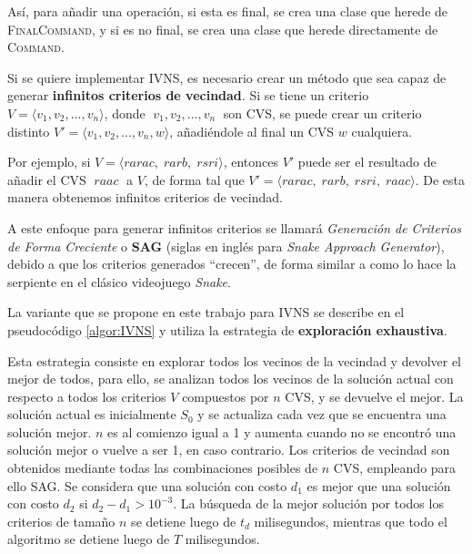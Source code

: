 \documentclass[a4paper,10pt,twocolumn]{article}
\begin{document}
	Así, para añadir una operación, si esta es final, se crea una clase que herede de 
	\textsc{FinalCommand}, y si es no final, se crea una clase que herede directamente
	de \textsc{Command}.

	Si se quiere implementar IVNS, es necesario crear un método que sea capaz de generar 
	\textbf{infinitos criterios de vecindad}. Si se tiene un criterio 
	$V = \langle v_1, v_2, ..., v_n \rangle$, donde $\; v_1, v_2, ..., v_n \;$ son CVS,
	se puede crear un criterio distinto $V' = \langle v_1, v_2, ..., v_n, w \rangle$, 
	añadiéndole al final un CVS $w$ cualquiera. 
	
	Por ejemplo, si	$V = \langle rarac,\; rarb, \; rsri \rangle $, entonces $V'$ puede ser el 
	resultado de añadir el CVS $\;raac\;$ a $V$, de forma tal que 
	$V'= \langle rarac,\; rarb,\; rsri,\; raac \rangle$. De esta manera obtenemos infinitos 
	criterios de vecindad.
	
	A este enfoque para generar infinitos criterios se llamará 
	\textit{Generación de Criterios de Forma Creciente} o \textbf{SAG} (siglas en inglés para 
	\textit{Snake Approach Generator}), debido a que los criterios generados
	``crecen'', de forma similar a como lo hace la serpiente en el clásico videojuego 
	\textit{Snake}.

	La variante que se propone en este trabajo para IVNS se describe en el pseudocódigo 
	\ref{algor:IVNS} y utiliza la estrategia de \textbf{exploración exhaustiva}.

	Esta estrategia consiste en explorar todos los vecinos de la vecindad y devolver el 
	mejor de todos, para ello, se analizan todos los vecinos de la solución actual con
	respecto a todos los criterios $V$ compuestos por $n$ CVS, y se devuelve el mejor. La solución actual es inicialmente $S_0$ y se actualiza cada vez que se encuentra una soluci\'on mejor. $n$ es al comienzo igual a 1 y aumenta cuando no se encontr\'o una solución mejor o vuelve a ser 1, en caso contrario. Los criterios de vecindad son obtenidos mediante todas las combinaciones posibles de $n$ CVS, empleando para ello SAG. Se considera que una soluci\'on con costo $d_1$ es mejor que una soluci\'on con costo $d_2$ si $d_2 - d_1 > 10^{-3}$. La b\'usqueda de la mejor soluci\'on por todos los criterios de tamaño $n$ se detiene luego de $t_d$ milisegundos, mientras que todo el algoritmo se detiene luego de $ T $ milisegundos.
\end{document}
